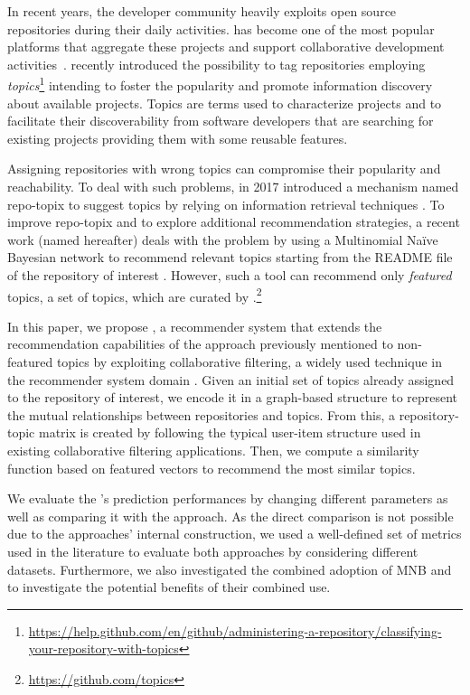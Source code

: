 In recent years, the developer community heavily exploits open source 
repositories during their daily activities. \GH has become one of the most
popular platforms that aggregate these projects and support collaborative 
development activities~\cite{7832894}. \GH recently introduced the possibility 
to tag repositories employing 
\emph{topics}\footnote{\url{https://help.github.com/en/github/administering-a-repository/classifying-your-repository-with-topics}}
 intending to foster the popularity and promote information discovery about 
available projects. Topics are terms used to characterize projects and to 
facilitate their discoverability from software developers that are searching 
for existing projects providing them with some reusable features. 

Assigning repositories with wrong topics can compromise their popularity and 
reachability. To deal with such problems, in 2017 \GH introduced a 
mechanism named repo-topix to suggest topics by relying on information 
retrieval techniques \cite{repo-topix}. To improve repo-topix 
and to explore additional recommendation strategies, a recent work (named \MNB
hereafter) deals with the problem by using a Multinomial Na\"ive Bayesian network to 
recommend relevant topics starting from the README file of the repository of 
interest \cite{10.1145/3383219.3383227}. However, such a tool can recommend 
only \emph{featured} topics, \ie a set of topics, which are curated by 
\GH.\footnote{\url{https://github.com/topics}}


In this paper, we propose \TF, a recommender system that extends the 
recommendation capabilities of the \MNB approach previously mentioned to 
non-featured topics by exploiting collaborative filtering, a widely used 
technique in the recommender system domain 
\cite{Schafer:2007:CFR:1768197.1768208}. Given an initial set of topics already 
assigned to the \GH repository of interest, we encode it in a graph-based 
structure to represent the mutual relationships between repositories and 
topics. From this, a repository-topic matrix is created by following the 
typical user-item structure used in existing collaborative filtering 
applications. Then, we compute a similarity function based on featured vectors 
to recommend the most similar topics.

We evaluate the \TF's prediction performances by changing different parameters 
as well as comparing it with the \MNB approach. As the direct comparison is not 
possible due to the approaches' internal construction, we used a well-defined 
set of metrics used in the literature to evaluate both approaches by 
considering different datasets. Furthermore, we also investigated the combined 
adoption of MNB and \TF to investigate the potential benefits of their combined 
use. 

